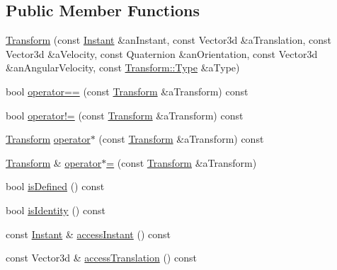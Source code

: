 \subsection*{Public Member Functions}
\begin{DoxyCompactItemize}
\item 
\hyperlink{classlibrary_1_1physics_1_1coord_1_1_transform_ac4b91f8f159f3319174e091cf6103cf9}{Transform} (const \hyperlink{classlibrary_1_1physics_1_1time_1_1_instant}{Instant} \&an\+Instant, const Vector3d \&a\+Translation, const Vector3d \&a\+Velocity, const Quaternion \&an\+Orientation, const Vector3d \&an\+Angular\+Velocity, const \hyperlink{classlibrary_1_1physics_1_1coord_1_1_transform_a4f19d7d232ce1fda0dcee16e4157db2c}{Transform\+::\+Type} \&a\+Type)
\item 
bool \hyperlink{classlibrary_1_1physics_1_1coord_1_1_transform_a7fd14bfb2953041a020521c3b34c5309}{operator==} (const \hyperlink{classlibrary_1_1physics_1_1coord_1_1_transform}{Transform} \&a\+Transform) const
\item 
bool \hyperlink{classlibrary_1_1physics_1_1coord_1_1_transform_a0481b3053d7dfb4a3cfc7ced3a13dc68}{operator!=} (const \hyperlink{classlibrary_1_1physics_1_1coord_1_1_transform}{Transform} \&a\+Transform) const
\item 
\hyperlink{classlibrary_1_1physics_1_1coord_1_1_transform}{Transform} \hyperlink{classlibrary_1_1physics_1_1coord_1_1_transform_a61e4d3b1cbbebb7e882f421d2f732d64}{operator$\ast$} (const \hyperlink{classlibrary_1_1physics_1_1coord_1_1_transform}{Transform} \&a\+Transform) const
\item 
\hyperlink{classlibrary_1_1physics_1_1coord_1_1_transform}{Transform} \& \hyperlink{classlibrary_1_1physics_1_1coord_1_1_transform_af0e36a56b799db736bd4e2228a48a8e6}{operator$\ast$=} (const \hyperlink{classlibrary_1_1physics_1_1coord_1_1_transform}{Transform} \&a\+Transform)
\item 
bool \hyperlink{classlibrary_1_1physics_1_1coord_1_1_transform_a782bf485d01d3ff9b38cabe94ff9406f}{is\+Defined} () const
\item 
bool \hyperlink{classlibrary_1_1physics_1_1coord_1_1_transform_a3349e51005c3240c373e89671ab847a6}{is\+Identity} () const
\item 
const \hyperlink{classlibrary_1_1physics_1_1time_1_1_instant}{Instant} \& \hyperlink{classlibrary_1_1physics_1_1coord_1_1_transform_aaa29bb2f60c383af21967078ed90fa6e}{access\+Instant} () const
\item 
const Vector3d \& \hyperlink{classlibrary_1_1physics_1_1coord_1_1_transform_a18fcdf0a8123a3e6a2551b93830fb909}{access\+Translation} () const

\end{DoxyCompactItemize}
